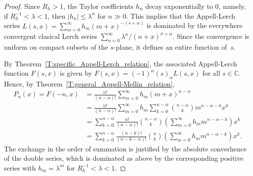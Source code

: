 \documentclass[11pt,a4paper]{amsart}
\newcommand{\C}{\mathbb{C}}
\newcommand{\pochhammer}[2]{(#1)_{#2}}
\theoremstyle{plain}
\theoremstyle{plain}
\theoremstyle{definition}
\theoremstyle{remark}
\begin{document}
\begin{proof}
Since $R_{h} > 1$, the Taylor coefficients $h_{n}$ decay exponentially to $0$, namely, if $R_{h}^{-1} < \lambda < 1$, then $|h_{n}| \leq \lambda^{n}$ for $n \gg 0$. This implies that the Appell-Lerch series $L(s,x) = \sum_{m=0}^{\infty} h_{m} (m+x)^{-(s+\alpha)}$ is dominated by the everywhere convergent clasical Lerch series $\sum_{n=0}^{\infty} \lambda^{n}/(n+x)^{\sigma + \alpha}$. Since the convergence is uniform on compact subsets of the $s$-plane, it defines an entire function of~$s$. 

By Theorem~\ref{T:specific_Appell-Lerch_relation}, the associated Appell-Lerch function $F(s,x)$ is given by $F(s,x) = (-1)^{\alpha} \pochhammer{s}{\alpha} L(s,x)$ for all $s \in \C$. Hence, by Theorem~\ref{T:general_Appell-Mellin_relation},
\begin{align*}
	   P_{n}(x)
	 = F(-n,x)
	&= \frac{n!}{(n-\alpha)!} \sum_{m=0}^{\infty} h_{m} (m+x)^{n-\alpha}
	\\
	&= \frac{n!}{(n-\alpha)!} 
	   \sum_{m=0}^{\infty} h_{m}
	   \sum_{k=0}^{n-\alpha} \binom{n-\alpha}{k} m^{n-\alpha-k} x^{k}
	\\
	&= \sum_{k=0}^{n-\alpha} \frac{n!}{(n-\alpha)!} \binom{n-\alpha}{k}
	   \left(\sum_{m=0}^{\infty} h_{m} m^{n-\alpha-k} \right) x^{k}
	\\
	&= \sum_{k=0}^{n-\alpha} \frac{(n-k)!}{(n-k-\alpha)!} \binom{n}{k}
	   \left(\sum_{m=0}^{\infty} h_{m} m^{n-\alpha-k} \right) x^{k}.
\end{align*}
The exchange in the order of summation is justified by the absolute converhence of the double series, which is dominated as above by the corresponding positive series with $h_{m} = \lambda^{m}$ for $R_{h}^{-1} < \lambda < 1$.
\end{proof}
\end{document}
